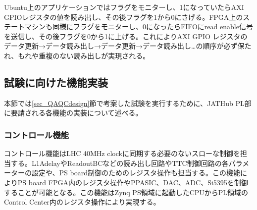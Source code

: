 Ubuntu上のアプリケーションではフラグをモニターし、1になっていたらAXI GPIOレジスタの値を読み出し、その後フラグを1から0にさげる。FPGA上のステートマシンも同様にフラグをモニターし、0になったらFIFOにread enable信号を送信し、その後フラグを0から1に上げる。これによりAXI GPIO レジスタのデータ更新→データ読み出し→データ更新→データ読み出し…の順序が必ず保たれ、もれや重複のない読み出しが実現される。

\subsection{試験に向けた機能実装}
\label{subsec_function}
本節では\ref{sec_QAQCdesign}節で考案した試験を実行するために、JATHub PL部に要請される各機能の実装について述べる。

\subsubsection{コントロール機能}
\label{subsubsec_control}
コントロール機能はLHC 40MHz clockに同期する必要のないスローな制御を担当する。L1AdelayやReadoutBCなどの読み出し回路やTTC制御回路の各パラメーターの設定や、PS board制御のためのレジスタ操作も担当する。この機能によりPS board FPGA内のレジスタ操作やPPASIC、DAC、ADC、Si5395を制御することが可能となる。この機能はZynq PS領域に起動したCPUからPL領域のControl Center内のレジスタ操作により実現する。

